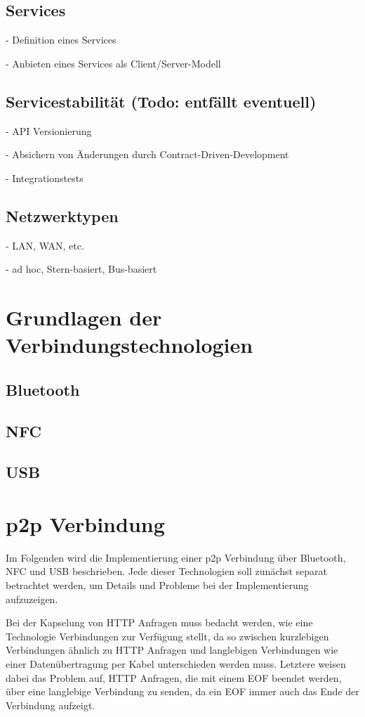 \documentclass[12pt,a4paper]{article}
\begin{document}
    \subsection{Services}
    - Definition eines Services
    
    
    - Anbieten eines Services als Client/Server-Modell
    
    \subsection{Servicestabilität (Todo: entfällt eventuell)}
    - API Versionierung
    
    - Absichern von Änderungen durch Contract-Driven-Development
    
    - Integrationstests
    \subsection{Netzwerktypen}
		- LAN, WAN, etc.
		
		- ad hoc, Stern-basiert, Bus-basiert
		\section{Grundlagen der Verbindungstechnologien}
		
		\subsection{Bluetooth}
		
		\subsection{NFC}
		
		\subsection{USB}
		
    \section{p2p Verbindung}
        Im Folgenden wird die Implementierung einer p2p Verbindung über Bluetooth, NFC und USB beschrieben. Jede dieser Technologien soll zunächst separat betrachtet werden, um Details und Probleme bei der Implementierung aufzuzeigen.
        
        Bei der Kapselung von HTTP Anfragen muss bedacht werden, wie eine Technologie Verbindungen zur Verfügung stellt, da so zwischen kurzlebigen Verbindungen ähnlich zu HTTP Anfragen und langlebigen Verbindungen wie einer Datenübertragung per Kabel unterschieden werden muss. Letztere weisen dabei das Problem auf, HTTP Anfragen, die mit einem EOF beendet werden, über eine langlebige Verbindung zu senden, da ein EOF immer auch das Ende der Verbindung aufzeigt.
        
\end{document}
